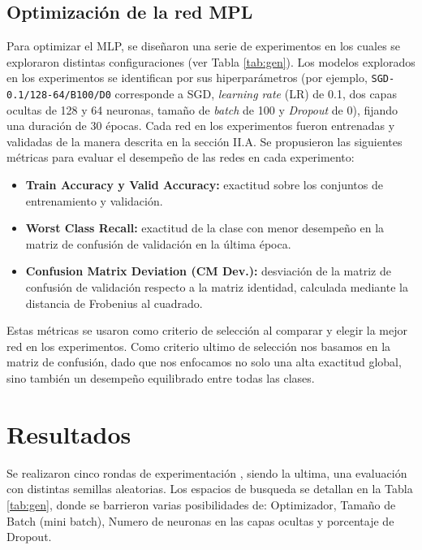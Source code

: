\documentclass[aps,prl,twocolumn,superscriptaddress]{revtex4-2}
\begin{document}
\subsection{Optimización de la red MPL}

Para optimizar el MLP, se diseñaron una serie de experimentos en los cuales se exploraron distintas configuraciones (ver Tabla \ref{tab:gen}). Los modelos explorados en los experimentos se identifican por sus hiperparámetros (por ejemplo, \texttt{SGD-0.1/128-64/B100/D0} corresponde a SGD, \textit{learning rate} (LR) de 0.1, dos capas ocultas de 128 y 64 neuronas, tamaño de \textit{batch} de 100 y \textit{Dropout} de 0), fijando una duración de 30 épocas. Cada red en los experimentos fueron entrenadas y validadas de la manera descrita en la sección II.A. Se propusieron las siguientes métricas para evaluar el desempeño de las redes en cada experimento:
\begin{itemize}
    \item \textbf{Train Accuracy y Valid Accuracy:} exactitud sobre los conjuntos de entrenamiento y validación.
    \item \textbf{Worst Class Recall:} exactitud de la clase con menor desempeño en la matriz de confusión de validación en la última época.
    \item \textbf{Confusion Matrix Deviation (CM Dev.):} desviación de la matriz de confusión de validación respecto a la matriz identidad, calculada mediante la distancia de Frobenius al cuadrado.
\end{itemize}
Estas métricas se usaron como criterio de selección al comparar y elegir la mejor red en los experimentos. Como criterio ultimo de selección nos basamos en la matriz de confusión, dado que nos enfocamos no solo una alta exactitud global, sino también un desempeño equilibrado entre todas las clases.







 \section{Resultados}
Se realizaron cinco rondas de experimentación \cite{wicher_redes_neuronales}, siendo la ultima, una evaluación con distintas semillas aleatorias. Los espacios de busqueda se detallan en la Tabla \ref{tab:gen}, donde se barrieron varias posibilidades de: Optimizador, Tamaño de Batch (mini batch), Numero de neuronas en las capas ocultas y porcentaje de Dropout.    
\end{document}
